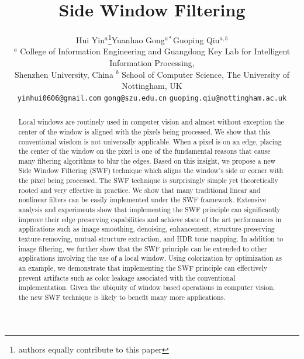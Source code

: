 \documentclass[10pt,twocolumn,letterpaper]{article}
\begin{document}
\title{Side Window Filtering}

\author{Hui Yin$^{a}$\thanks{authors equally contribute to this paper}\quad Yuanhao Gong$^{a*}$\quad Guoping Qiu$^{a,b}$\\
$^a$ College of Information Engineering and Guangdong Key Lab for Intelligent Information Processing,\\
Shenzhen University, China $^b$ School of Computer Science, The University of Nottingham, UK\\
{\tt\small yinhui0606@gmail.com}
{\tt\small gong@szu.edu.cn}
{\tt\small guoping.qiu@nottingham.ac.uk}
}

\maketitle
\thispagestyle{empty}

\begin{abstract}
   Local windows are routinely used in computer vision and almost without exception the center of the window is aligned with the pixels being processed. We show that this conventional wisdom is not universally applicable. When a pixel is on an edge, placing the center of the window on the pixel is one of the fundamental reasons that cause many filtering algorithms to blur the edges. Based on this insight, we propose a new Side Window Filtering (SWF) technique which aligns the window's side or corner with the pixel being processed. The SWF technique is surprisingly simple yet theoretically rooted and very effective in practice. We show that many traditional linear and nonlinear filters can be easily implemented under the SWF framework. Extensive analysis and experiments show that implementing the SWF principle can significantly improve their edge preserving capabilities and achieve state of the art performances in applications such as image smoothing, denoising, enhancement, structure-preserving texture-removing, mutual-structure extraction, and HDR tone mapping. In addition to image filtering, we further show that the SWF principle can be extended to other applications involving the use of a local window. Using colorization by optimization as an example, we demonstrate that implementing the SWF principle can effectively prevent artifacts such as color leakage associated with the conventional implementation. Given the ubiquity of window based operations in computer vision, the new SWF technique is likely to benefit many more applications.
\end{abstract}
\end{document}
